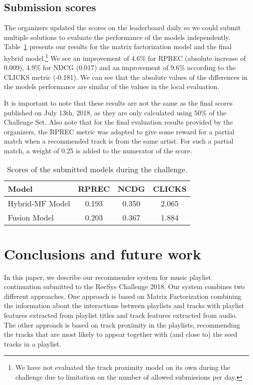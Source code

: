 \subsection{Submission scores}

The organizers updated the scores on the leaderboard daily so we could submit multiple solutions to evaluate the performance of the models independently. 
Table~\ref{tab:submission} presents our results for the matrix factorization model and the final hybrid model.\footnote{We have not evaluated the track proximity model on its own during the challenge due to limitation on the number of allowed submissions per day.}  We see an improvement of 4.6\% for RPREC (absolute increase of 0.009), 4.9\% for NDCG (0.017) and an improvement of 9.6\% according to the CLICKS metric (-0.181). We can see that the absolute values of the differences in the models performance are similar of the values in the local evaluation.


It is important to note that these results are not the same as the final scores published on July 13th, 2018, as they are only calculated using 50\% of the Challenge Set. Also note that for the final evaluation results provided by the organizers, the RPREC metric was adapted to give some reward for a partial match when a recommended track is from the same artist. For such a partial match, a weight of 0.25 is added to the numerator of the score. 


\begin{table}
  \caption{Scores of the submitted models during the challenge.}
  \label{tab:submission}
  \begin{tabular}{lccc}
    \toprule
    Model&RPREC&NCDG&CLICKS\\
    \midrule
    Hybrid-MF Model&0.193&0.350&2.065\\
    Fusion Model&0.203&0.367&1.884\\
  \bottomrule
\end{tabular}
\end{table}




\section{Conclusions and future work}
In this paper, we describe our recommender system for music playlist continuation submitted to the RecSys Challenge 2018. Our system combines two different approaches. One approach is based on Matrix Factorization combining the information about the interactions between playlists and tracks with playlist features extracted from playlist titles and track features extracted from audio. The other approach is based on track proximity in the playlists, recommending the tracks that are most likely to appear together with (and close to) the seed tracks in a playlist.

